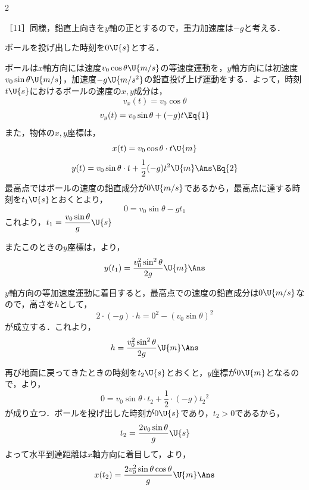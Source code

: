 \begin{multicols}{2}
\begin{sisin}
［11］同様，鉛直上向きを$y$軸の正とするので，重力加速度は$-g$と考える．
\end{sisin}
\par\nopagebreak
\hspace{1zw}ボールを投げ出した時刻を$0\U{s}$とする．
\begin{komon}
 ボールは$x$軸方向には速度$v_0\cos\theta\U{m/s}$の等速度運動を，$y$軸方向には初速度$v_0\sin\theta\U{m/s}$，加速度$-g\U{m/s^2}$の鉛直投げ上げ運動をする．よって，時刻$t\U{s}$におけるボールの速度の$x,y$成分は，
       \[v_x(t)=v_0\cos\theta\]
       \[v_y(t)=v_0\sin\theta+(-g)t\Eq{1}\]
       \hspace{1zw}また，物体の$x,y$座標は，
       \[x(t)=v_0\cos\theta\cdot t\U{m}\]
       \[y(t)=v_0\sin\theta\cdot t+\frac{1}{2}(-g)t^2\U{m}\Ans\Eq{2}\]
 最高点ではボールの速度の鉛直成分が$0\U{m/s}$であるから，最高点に達する時刻を$t_1\U{s}$とおくとより，
       \[0=v_0\sin\theta-gt_1\]
       これより，$t_1=\dfrac{v_0\sin\theta}{g}\U{s}$\Ans{}\par
       \hspace{1zw}またこのときの$y$座標は，より，
       \[y(t_1)=\frac{v_0^2\sin^2\theta}{2g}\U{m}\Ans\]
\end{komon}
\begin{bekkai}
\hspace{1zw}$y$軸方向の等加速度運動に着目すると，最高点での速度の鉛直成分は$0\U{m/s}$なので，高さを$h$として，
\[2\cdot(-g)\cdot h=0^2-(v_0\sin\theta)^2\]
が成立する．これより，
\[h=\frac{v_0^2\sin^2\theta}{2g}\U{m}\Ans\]
\end{bekkai}
\begin{komon}
 再び地面に戻ってきたときの時刻を$t_2\U{s}$とおくと，$y$座標が$0\U{m}$となるので，より，
       \[0=v_0\sin\theta\cdot t_2+\frac{1}{2}\cdot(-g){t_2}^2\]
       が成り立つ．ボールを投げ出した時刻が$0\U{s}$であり，$t_2>0$であるから，
       \[t_2=\frac{2v_0\sin\theta}{g}\U{s}\]
       \hspace{1zw}よって水平到達距離は$x$軸方向に着目して，より，
       \[x(t_2)=\frac{2v_0^2\sin\theta\cos\theta}{g}\U{m}\Ans\]
\end{komon}


\end{multicols}
